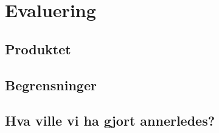 \chapter{Evaluering}

\section{Produktet}

\section{Begrensninger}

\section{Hva ville vi ha gjort annerledes?}